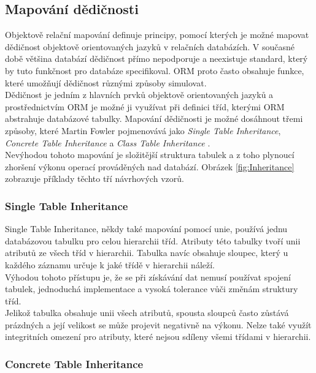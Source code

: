 \documentclass[ing,male,java,dept456]{diploma}						%
\begin{document}
\subsection{Mapování dědičnosti}
\label{subsec:Inhmapping}
Objektově relační mapování definuje principy, pomocí kterých je možné mapovat dědičnost objektově orientovaných jazyků v relačních databázích. V současné době většina databází dědičnost přímo nepodporuje a neexistuje standard, který by tuto funkčnost pro databáze specifikoval. ORM proto často obsahuje funkce, které umožňují dědičnost různými způsoby simulovat. \\
Dědičnost je jedním z hlavních prvků objektově orientovaných jazyků a prostřednictvím ORM je možné ji využívat při definici tříd, kterými ORM abstrahuje databázové tabulky. Mapování dědičnosti je možné dosáhnout třemi způsoby, které Martin Fowler pojmenovává jako \textit{Single Table Inheritance}, \textit{Concrete Table Inheritance} a \textit{Class Table Inheritance} \cite{fowler}. \\
Nevýhodou tohoto mapování je složitější struktura tabulek a z toho plynoucí zhoršení výkonu operací prováděných nad databází. Obrázek \ref{fig:Inheritance} zobrazuje příklady těchto tří návrhových vzorů.


\subsubsection{Single Table Inheritance}

Single Table Inheritance, někdy také mapování pomocí unie, používá jednu databázovou tabulku pro celou hierarchii tříd. Atributy této tabulky tvoří unii atributů ze všech tříd v hierarchii. Tabulka navíc obsahuje sloupec, který u každého záznamu určuje k jaké třídě v hierarchii náleží. \\
Výhodou tohoto přístupu je, že se při získávání dat nemusí používat spojení tabulek, jednoduchá implementace a vysoká tolerance vůči změnám struktury tříd. \\
Jelikož tabulka obsahuje unii všech atributů, spousta sloupců často zůstává prázdných a její velikost se může projevit negativně na výkonu. Nelze také využít integritních omezení pro atributy, které nejsou sdíleny všemi třídami v hierarchii.

\subsubsection{Concrete Table Inheritance}
\end{document}
